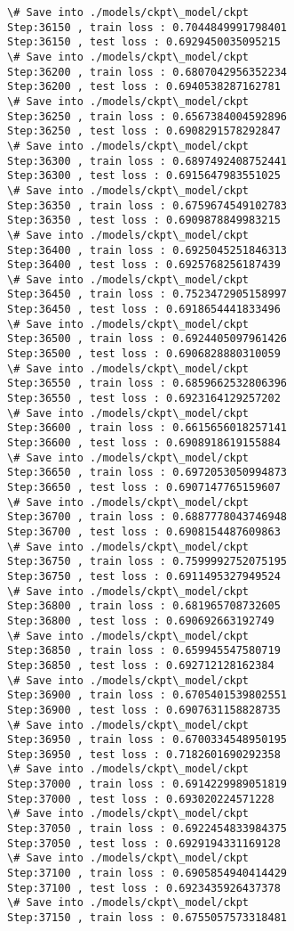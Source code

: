 \documentclass[11pt]{article}
\begin{document}
\begin{Verbatim}[commandchars=\\\{\}]
\# Save into ./models/ckpt\_model/ckpt
Step:36150 , train loss : 0.7044849991798401
Step:36150 , test loss : 0.6929450035095215
\# Save into ./models/ckpt\_model/ckpt
Step:36200 , train loss : 0.6807042956352234
Step:36200 , test loss : 0.6940538287162781
\# Save into ./models/ckpt\_model/ckpt
Step:36250 , train loss : 0.6567384004592896
Step:36250 , test loss : 0.6908291578292847
\# Save into ./models/ckpt\_model/ckpt
Step:36300 , train loss : 0.6897492408752441
Step:36300 , test loss : 0.6915647983551025
\# Save into ./models/ckpt\_model/ckpt
Step:36350 , train loss : 0.6759674549102783
Step:36350 , test loss : 0.6909878849983215
\# Save into ./models/ckpt\_model/ckpt
Step:36400 , train loss : 0.6925045251846313
Step:36400 , test loss : 0.6925768256187439
\# Save into ./models/ckpt\_model/ckpt
Step:36450 , train loss : 0.7523472905158997
Step:36450 , test loss : 0.6918654441833496
\# Save into ./models/ckpt\_model/ckpt
Step:36500 , train loss : 0.6924405097961426
Step:36500 , test loss : 0.6906828880310059
\# Save into ./models/ckpt\_model/ckpt
Step:36550 , train loss : 0.6859662532806396
Step:36550 , test loss : 0.6923164129257202
\# Save into ./models/ckpt\_model/ckpt
Step:36600 , train loss : 0.6615656018257141
Step:36600 , test loss : 0.6908918619155884
\# Save into ./models/ckpt\_model/ckpt
Step:36650 , train loss : 0.6972053050994873
Step:36650 , test loss : 0.6907147765159607
\# Save into ./models/ckpt\_model/ckpt
Step:36700 , train loss : 0.6887778043746948
Step:36700 , test loss : 0.6908154487609863
\# Save into ./models/ckpt\_model/ckpt
Step:36750 , train loss : 0.7599992752075195
Step:36750 , test loss : 0.6911495327949524
\# Save into ./models/ckpt\_model/ckpt
Step:36800 , train loss : 0.681965708732605
Step:36800 , test loss : 0.690692663192749
\# Save into ./models/ckpt\_model/ckpt
Step:36850 , train loss : 0.659945547580719
Step:36850 , test loss : 0.692712128162384
\# Save into ./models/ckpt\_model/ckpt
Step:36900 , train loss : 0.6705401539802551
Step:36900 , test loss : 0.6907631158828735
\# Save into ./models/ckpt\_model/ckpt
Step:36950 , train loss : 0.6700334548950195
Step:36950 , test loss : 0.7182601690292358
\# Save into ./models/ckpt\_model/ckpt
Step:37000 , train loss : 0.6914229989051819
Step:37000 , test loss : 0.693020224571228
\# Save into ./models/ckpt\_model/ckpt
Step:37050 , train loss : 0.6922454833984375
Step:37050 , test loss : 0.6929194331169128
\# Save into ./models/ckpt\_model/ckpt
Step:37100 , train loss : 0.6905854940414429
Step:37100 , test loss : 0.6923435926437378
\# Save into ./models/ckpt\_model/ckpt
Step:37150 , train loss : 0.6755057573318481

\end{Verbatim}
\end{document}
